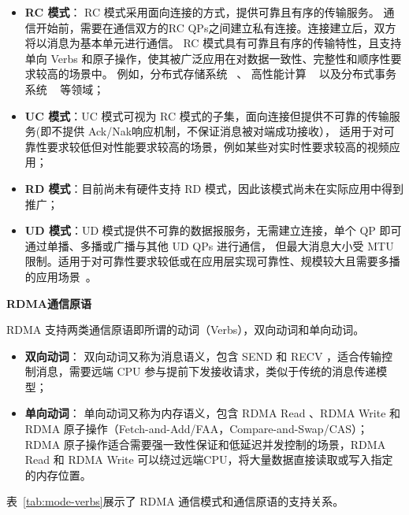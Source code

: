 {    \begin{itemize}
        \item \textbf{RC 模式}： RC 模式采用面向连接的方式，提供可靠且有序的传输服务。
              通信开始前，需要在通信双方的RC QPs之间建立私有连接。连接建立后，双方将以消息为基本单元进行通信。
              RC 模式具有可靠且有序的传输特性，且支持单向 Verbs 和原子操作，使其被广泛应用在对数据一致性、完整性和顺序性要求较高的场景中。
              例如，分布式存储系统 ~\citep{christopher2013pilaf, drago2014farm, xingda2020xstore}、
              高性能计算 ~\citep{graham2005OpenMPI, Huang2006MVAPICH2} 以及分布式事务系统 ~\citep{xingda2018DrTM+H} 等领域；
        \item \textbf{UC 模式}：UC 模式可视为 RC 模式的子集，面向连接但提供不可靠的传输服务(即不提供 Ack/Nak响应机制，不保证消息被对端成功接收），
              适用于对可靠性要求较低但对性能要求较高的场景，例如某些对实时性要求较高的视频应用；
        \item \textbf{RD 模式}：目前尚未有硬件支持 RD 模式，因此该模式尚未在实际应用中得到推广；
        \item \textbf{UD 模式}：UD 模式提供不可靠的数据报服务，无需建立连接，单个 QP 即可通过单播、多播或广播与其他 UD QPs 进行通信，
              但最大消息大小受 MTU 限制。适用于对可靠性要求较低或在应用层实现可靠性、规模较大且需要多播的应用场景~\citep{kalia2014herd,kalia2016fasst}。
    \end{itemize}

    \textbf{RDMA通信原语}

    RDMA 支持两类通信原语即所谓的动词（Verbs），双向动词和单向动词。

    \begin{itemize}
        \item \textbf{双向动词}： 双向动词又称为消息语义，包含 SEND 和 RECV ，适合传输控制消息，需要远端 CPU 参与提前下发接收请求，类似于传统的消息传递模型；
        \item \textbf{单向动词}： 单向动词又称为内存语义，包含 RDMA Read 、RDMA Write 和 RDMA 原子操作（Fetch-and-Add/FAA，Compare-and-Swap/CAS）；
              RDMA 原子操作适合需要强一致性保证和低延迟并发控制的场景，RDMA Read 和 RDMA Write 可以绕过远端CPU，将大量数据直接读取或写入指定的内存位置。
    \end{itemize}

    表~\ref{tab:mode-verbs}展示了 RDMA 通信模式和通信原语的支持关系。

}
